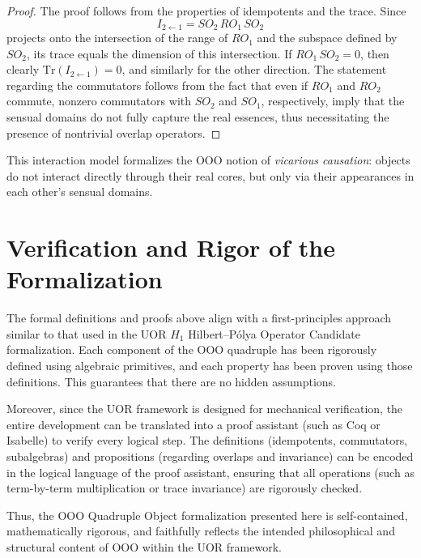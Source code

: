 \documentclass[12pt]{article}
\begin{document}
\begin{proof}
The proof follows from the properties of idempotents and the trace. Since 
\[
I_{2\leftarrow 1} = SO_2 \, RO_1 \, SO_2
\]
projects onto the intersection of the range of $RO_1$ and the subspace defined by $SO_2$, its trace equals the dimension of this intersection. If $RO_1 \, SO_2=0$, then clearly $\mathrm{Tr}(I_{2\leftarrow 1})=0$, and similarly for the other direction. The statement regarding the commutators follows from the fact that even if $RO_1$ and $RO_2$ commute, nonzero commutators with $SO_2$ and $SO_1$, respectively, imply that the sensual domains do not fully capture the real essences, thus necessitating the presence of nontrivial overlap operators.
\end{proof}

This interaction model formalizes the OOO notion of \emph{vicarious causation}: objects do not interact directly through their real cores, but only via their appearances in each other’s sensual domains.

\section{Verification and Rigor of the Formalization}

The formal definitions and proofs above align with a first-principles approach similar to that used in the UOR $H_1$ Hilbert--Pólya Operator Candidate formalization. Each component of the OOO quadruple has been rigorously defined using algebraic primitives, and each property has been proven using those definitions. This guarantees that there are no hidden assumptions.

Moreover, since the UOR framework is designed for mechanical verification, the entire development can be translated into a proof assistant (such as Coq or Isabelle) to verify every logical step. The definitions (idempotents, commutators, subalgebras) and propositions (regarding overlaps and invariance) can be encoded in the logical language of the proof assistant, ensuring that all operations (such as term-by-term multiplication or trace invariance) are rigorously checked.

Thus, the OOO Quadruple Object formalization presented here is self-contained, mathematically rigorous, and faithfully reflects the intended philosophical and structural content of OOO within the UOR framework.

\medskip
\end{document}
